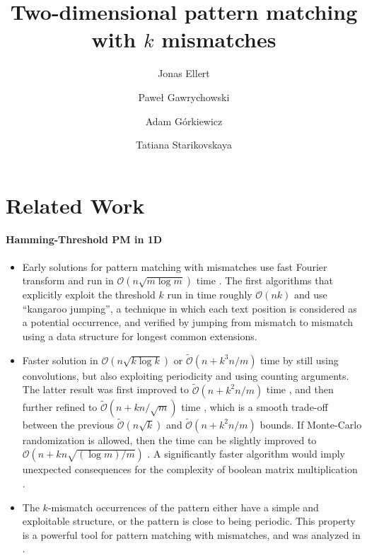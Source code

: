 \documentclass[11pt]{article}
\title{Two-dimensional pattern matching with $k$ mismatches}
\author[1]{Jonas Ellert}
\author[2]{Paweł Gawrychowski}
\author[3]{Adam Górkiewicz}
\author[4]{Tatiana Starikovskaya}
\affil[1]{?}
\affil[2]{?}
\affil[3]{?}
\affil[4]{?}
\renewcommand{\O}{\mathcal{O}}
\newcommand{\tO}{\tilde{\mathcal{O}}}
\theoremstyle{plain}
\theoremstyle{definition}
\theoremstyle{remark}
\begin{document}
\date{}
\maketitle

\begin{abstract}
\end{abstract}



\section{Related Work}

\paragraph{Hamming-Threshold PM in 1D}


\begin{itemize}
	\item Early solutions for pattern matching with mismatches use fast Fourier transform and run in $\O(n \sqrt{m \log m})$ time \cite{Abrahamson1987}. The first algorithms that explicitly exploit the threshold $k$ run in time roughly $\O(nk)$ \cite{Landau1986,Galil1986} and use ``kangaroo jumping'', a technique in which each text position is considered as a potential occurrence, and verified by jumping from mismatch to mismatch using a data structure for longest common extensions.
	\item Faster solution in $\O(n\sqrt{k \log k})$ or $\tO(n + k^3n/m)$ time \cite{Amir2004} by still using convolutions, but also exploiting periodicity and using counting arguments. The latter result was first improved to $\tO(n + k^2n/m)$ time \cite{Clifford2016a}, and then further refined to $\tO(n + kn/\sqrt{m})$ time \cite{Gawrychowski2018}, which is a smooth trade-off between the previous $\tO(n\sqrt{k})$ and $\tO(n + k^2n/m)$ bounds. If Monte-Carlo randomization is allowed, then the time can be slightly improved to $\O(n + kn\sqrt{(\log m) / m})$ \cite{Chan2020}. A significantly faster algorithm would imply unexpected consequences for the complexity of boolean matrix multiplication \cite{Gawrychowski2018}.
	\item The $k$-mismatch occurrences of the pattern either have a simple and exploitable structure, or the pattern is close to being periodic. This property is a powerful tool for pattern matching with mismatches, and was analyzed in \cite{Bringmann2019,Charalampopoulos2020a}.
\end{itemize}
\end{document}
